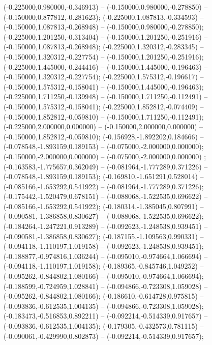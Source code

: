  (-0.225000,0.980000,-0.346913) -- (-0.150000,0.980000,-0.278850) -- (-0.150000,0.877812,-0.281623);
 (-0.225000,1.087813,-0.334593) -- (-0.150000,1.087813,-0.268948) -- (-0.150000,0.980000,-0.278850);
 (-0.225000,1.201250,-0.313404) -- (-0.150000,1.201250,-0.251916) -- (-0.150000,1.087813,-0.268948);
 (-0.225000,1.320312,-0.283345) -- (-0.150000,1.320312,-0.227754) -- (-0.150000,1.201250,-0.251916);
 (-0.225000,1.445000,-0.244416) -- (-0.150000,1.445000,-0.196463) -- (-0.150000,1.320312,-0.227754);
 (-0.225000,1.575312,-0.196617) -- (-0.150000,1.575312,-0.158041) -- (-0.150000,1.445000,-0.196463);
 (-0.225000,1.711250,-0.139948) -- (-0.150000,1.711250,-0.112491) -- (-0.150000,1.575312,-0.158041);
 (-0.225000,1.852812,-0.074409) -- (-0.150000,1.852812,-0.059810) -- (-0.150000,1.711250,-0.112491);
 (-0.225000,2.000000,0.000000) -- (-0.150000,2.000000,0.000000) -- (-0.150000,1.852812,-0.059810);
 (-0.156928,-1.892202,0.184666) -- (-0.078548,-1.893159,0.189153) -- (-0.075000,-2.000000,0.000000);
 (-0.150000,-2.000000,0.000000) -- (-0.075000,-2.000000,0.000000) ;
 (-0.163583,-1.775657,0.362049) -- (-0.081964,-1.777289,0.371226) -- (-0.078548,-1.893159,0.189153);
 (-0.169810,-1.651291,0.528014) -- (-0.085166,-1.653292,0.541922) -- (-0.081964,-1.777289,0.371226);
 (-0.175442,-1.520479,0.678151) -- (-0.088068,-1.522535,0.696622) -- (-0.085166,-1.653292,0.541922);
 (-0.180314,-1.385045,0.807991) -- (-0.090581,-1.386858,0.830627) -- (-0.088068,-1.522535,0.696622);
 (-0.184264,-1.247221,0.913289) -- (-0.092623,-1.248538,0.939451) -- (-0.090581,-1.386858,0.830627);
 (-0.187155,-1.109563,0.990331) -- (-0.094118,-1.110197,1.019158) -- (-0.092623,-1.248538,0.939451);
 (-0.188877,-0.974816,1.036244) -- (-0.095010,-0.974664,1.066694) -- (-0.094118,-1.110197,1.019158);
 (-0.189365,-0.845746,1.049252) -- (-0.095262,-0.844802,1.080166) -- (-0.095010,-0.974664,1.066694);
 (-0.188599,-0.724959,1.028841) -- (-0.094866,-0.723308,1.059028) -- (-0.095262,-0.844802,1.080166);
 (-0.186610,-0.614728,0.975815) -- (-0.093836,-0.612535,1.004135) -- (-0.094866,-0.723308,1.059028);
 (-0.183473,-0.516853,0.892211) -- (-0.092214,-0.514339,0.917657) -- (-0.093836,-0.612535,1.004135);
 (-0.179305,-0.432573,0.781115) -- (-0.090061,-0.429990,0.802873) -- (-0.092214,-0.514339,0.917657);
